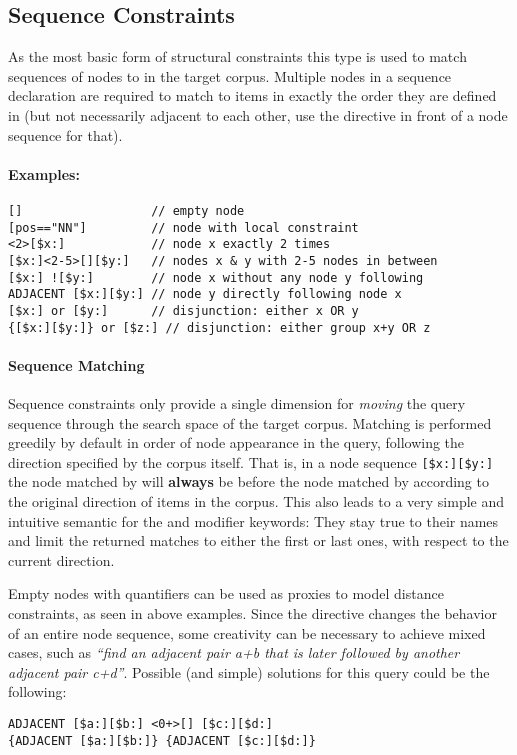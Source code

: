 \documentclass[11pt,a4paper]{report}
\begin{document}
\subsection{Sequence Constraints}
\label{sec:sequence-constraints}

As the most basic form of structural constraints this type is used to match sequences of nodes to  in the target corpus.
Multiple nodes in a sequence declaration are required to match to items in exactly the order they are defined in (but not necessarily adjacent to each other, use the  directive in front of a node sequence for that).

\paragraph{Examples:}

\begin{Verbatim}[samepage=true]
[]                  // empty node
[pos=="NN"]         // node with local constraint
<2>[$x:]            // node x exactly 2 times       
[$x:]<2-5>[][$y:]   // nodes x & y with 2-5 nodes in between
[$x:] ![$y:]        // node x without any node y following
ADJACENT [$x:][$y:] // node y directly following node x
[$x:] or [$y:]      // disjunction: either x OR y
{[$x:][$y:]} or [$z:] // disjunction: either group x+y OR z
\end{Verbatim}

\paragraph{Sequence Matching}
\noindent Sequence constraints only provide a single dimension for \textit{moving} the query sequence through the search space of the target corpus.
Matching is performed greedily by default in order of node appearance in the query, following the direction specified by the corpus itself.
That is, in a node sequence \verb|[$x:][$y:]| the node matched by  will \textbf{always} be before the node matched by  according to the original direction of items in the corpus.
This also leads to a very simple and intuitive semantic for the  and  modifier keywords: They stay true to their names and limit the returned matches to either the first or last ones, with respect to the current direction.

Empty nodes with quantifiers can be used as proxies to model distance constraints, as seen in above examples.
Since the  directive changes the behavior of an entire node sequence, some creativity can be necessary to achieve mixed cases, such as \textit{``find an adjacent pair a+b that is later followed by another adjacent pair c+d''}.
Possible (and simple) solutions for this query could be the following:
\begin{Verbatim}[samepage=true]
ADJACENT [$a:][$b:] <0+>[] [$c:][$d:]
{ADJACENT [$a:][$b:]} {ADJACENT [$c:][$d:]}
\end{Verbatim}
\end{document}
